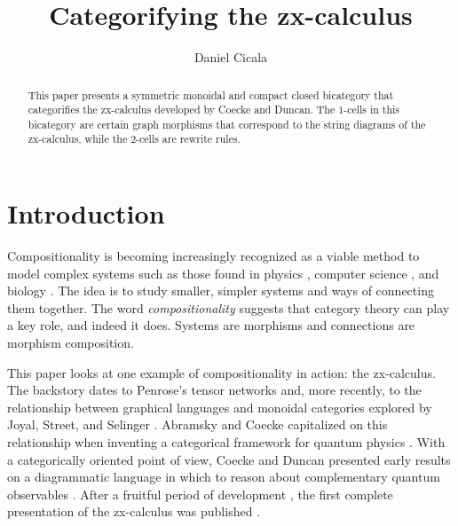 \documentclass[11pt]{amsart}
\theoremstyle{remark}
\theoremstyle{definition}
\begin{document}
	

\begin{abstract}
	This paper presents a symmetric monoidal and compact closed bicategory that categorifies the zx-calculus developed by Coecke and Duncan.  The $1$-cells in this bicategory are certain graph morphisms that correspond to the string diagrams of the zx-calculus, while the $2$-cells are rewrite rules. 
\end{abstract}

\title{Categorifying the zx-calculus}
\author{Daniel Cicala}
\maketitle

\section{Introduction}
\label{sec:Introduction}

Compositionality is becoming increasingly recognized as a viable method to model complex systems such as those found in physics \cite{AbramCoecke_CatSemanticQuantum}, computer science \cite{SassoneSobocinski_PetriNets}, and biology \cite{BaezFongPollard_CompMarkovProcesses}.  The idea is to study smaller, simpler systems and ways of connecting them together.  The word \emph{compositionality} suggests that category theory can play a key role, and indeed it does.  Systems are morphisms and connections are morphism composition.   

This paper looks at one example of compositionality in action: the zx-calculus.  The backstory dates to Penrose's tensor networks \cite{Penrose_NegDimTensors} and, more recently, to the relationship between graphical languages and monoidal categories explored by Joyal, Street, and Selinger \cite{JoyalStreet_GeomTensorCalc,Selinger_GraphicsMonCats}.  Abramsky and Coecke capitalized on this relationship when inventing a categorical framework for quantum physics \cite{AbramCoecke_CatSemanticQuantum}.  With a categorically oriented point of view, Coecke and Duncan  presented early results on a diagrammatic language in which to reason about complementary quantum observables \cite{CoeckeDuncan_QuantumObsInitialReport}. After a fruitful period of development \cite{CoeckeEdwards_ToyTheories,CoeckeEdwardsSpekkens_PhaseGrpsNonLocality,CoeckePerdix_EnvironClassicChannels,DuncanPerdix_GraphStatesEulerDecomp,DuncanPerdrix_RewritingQuantumCompu,EvansDuncanLangPanan_ClassMutualUnbias,Pavlovic_QuanClassNondetermCompu}, the first complete presentation of the zx-calculus was published \cite{CoeckeDuncan_QuantumObsFullPaper}.  
\end{document}

